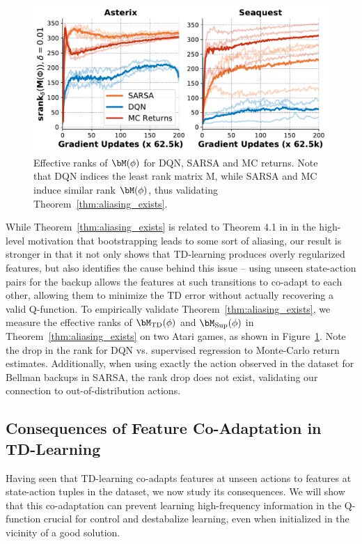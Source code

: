 \begin{figure}
    \centering
    \vspace{-10pt}
    \includegraphics[width=0.97\linewidth]{section3_figs/srank_sarsa_vs_mc_vs_dqn_fig1_only_main_paper.pdf}
    \vspace{-0.14cm}
    \caption{\small{Effective ranks of $\bM(\phi)$ for DQN, SARSA and MC returns. Note that DQN indices the least rank matrix M, while SARSA and MC induce similar rank $\bM(\phi)$, thus validating Theorem~\ref{thm:aliasing_exists}.}}
    \label{fig:srank}
    \vspace{-0.4cm}
\end{figure}
While Theorem~\ref{thm:aliasing_exists} is related to Theorem 4.1 in \citep{kumar2021implicit} in the high-level motivation that bootstrapping leads to some sort of aliasing, our result is stronger in that it not only shows that TD-learning produces overly regularized features, but also identifies the cause behind this issue -- using unseen state-action pairs for the backup allows the features at such transitions to co-adapt to each other, allowing them to minimize the TD error without actually recovering a valid Q-function.
To empirically validate Theorem~\ref{thm:aliasing_exists}, we measure the effective ranks of $\bM_{\mathrm{TD}}(\phi)$ and $\bM_{\mathrm{Sup}}(\phi)$ in Theorem~\ref{thm:aliasing_exists} on two Atari games, as shown in Figure~\ref{fig:srank}. Note the drop in the rank for DQN vs. supervised regression to Monte-Carlo return estimates. Additionally, when using exactly the action observed in the dataset for Bellman backups in SARSA, the rank drop does not exist, validating our connection to out-of-distribution actions.   

\subsection{Consequences of Feature Co-Adaptation in TD-Learning}
Having seen that TD-learning co-adapts features at unseen actions to features at state-action tuples in the dataset, we now study its consequences. We will show that this co-adaptation can prevent learning high-frequency information in the Q-function crucial for control and destabalize learning, even when initialized in the vicinity of a good solution.

